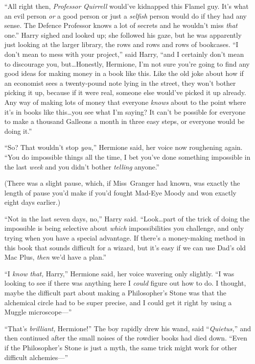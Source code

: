 “All right then, \emph{Professor Quirrell} would’ve kidnapped this Flamel guy. It’s what an evil person \emph{or} a good person or just a \emph{selfish} person would do if they had any sense. The Defence Professor knows a lot of secrets and he wouldn’t miss \emph{that} one.” Harry sighed and looked up; she followed his gaze, but he was apparently just looking at the larger library, the rows and rows and rows of bookcases. “I don’t mean to mess with your project,” said Harry, “and I certainly don’t mean to discourage you, but…Honestly, Hermione, I’m not sure you’re going to find any good ideas for making money in a book like this. Like the old joke about how if an economist sees a twenty-pound note lying in the street, they won’t bother picking it up, because if it were real, someone else would’ve picked it up already. Any way of making lots of money that everyone \emph{knows} about to the point where it’s in books like this…you see what I’m saying? It can’t be possible for everyone to make a thousand Galleons a month in three easy steps, or everyone would be doing it.”

“So? That wouldn’t stop \emph{you,}” Hermione said, her voice now roughening again. “You do impossible things all the time, I bet you’ve done something impossible in the last \emph{week} and you didn’t bother \emph{telling} anyone.”

(There was a slight pause, which, if Miss~Granger had known, was exactly the length of pause you’d make if you’d fought Mad-Eye Moody and won exactly eight days earlier.)

“Not in the last seven days, no,” Harry said. “Look…part of the trick of doing the impossible is being selective about \emph{which} impossibilities you challenge, and only trying when you have a special advantage. If there’s a money-making method in this book that sounds difficult for a wizard, but it’s easy if we can use Dad’s old Mac Plus, \emph{then} we’d have a plan.”

“I \emph{know that,} Harry,” Hermione said, her voice wavering only slightly. “I was looking to see if there was anything here I \emph{could} figure out how to do. I thought, maybe the difficult part about making a Philosopher’s Stone was that the alchemical circle had to be super precise, and I could get it right by using a Muggle microscope—”

“That’s \emph{brilliant,} Hermione!” The boy rapidly drew his wand, said “\emph{Quietus,}” and then continued after the small noises of the rowdier books had died down. “Even if the Philosopher’s Stone is just a myth, the same trick might work for other difficult alchemies—”

